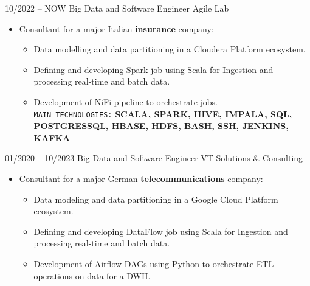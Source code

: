 \documentclass[9pt]{developercv} %
\begin{document}
    \vspace{-10 pt}
    \begin{entrylist}
        \entry
        {10/2022 -- NOW}
        {Big Data and Software Engineer}
        {Agile Lab}
        {\vspace{-10pt}
            \begin{itemize}[noitemsep,topsep=0pt,parsep=0pt,partopsep=0pt, leftmargin=-1pt]
                \item {Consultant for a major Italian \textbf{insurance} company:}
                \begin{itemize}[noitemsep,topsep=0pt,parsep=0pt,partopsep=0pt]
                    \item {Data modelling and data partitioning in a Cloudera Platform ecosystem.}
                    \item {Defining and developing Spark job using Scala for Ingestion and processing real-time and batch data.}
                    \item {Development of NiFi pipeline to orchestrate jobs.}
                    \texttt{\\MAIN TECHNOLOGIES:} \textbf{SCALA, SPARK, HIVE, IMPALA, SQL, POSTGRESSQL, HBASE, HDFS, BASH, SSH, JENKINS, KAFKA}
                \end{itemize}
            \end{itemize} }
        \entry
        {01/2020 -- 10/2023}
        {Big Data and Software Engineer}
        {VT Solutions \& Consulting}
        {\vspace{-10pt}
            \begin{itemize}[noitemsep,topsep=0pt,parsep=0pt,partopsep=0pt, leftmargin=-1pt]
                \item {Consultant for a major German \textbf{telecommunications} company:}
                \begin{itemize}[noitemsep,topsep=0pt,parsep=0pt,partopsep=0pt]
                    \item {Data modeling and data partitioning in a Google Cloud Platform ecosystem.}
                    \item {Defining and developing DataFlow job using Scala for Ingestion and processing real-time and batch data.}
                    \item {Development of Airflow DAGs using Python to orchestrate ETL operations on data for a DWH.}

\end{itemize}
\end{itemize}}
\end{entrylist}
\end{document}
